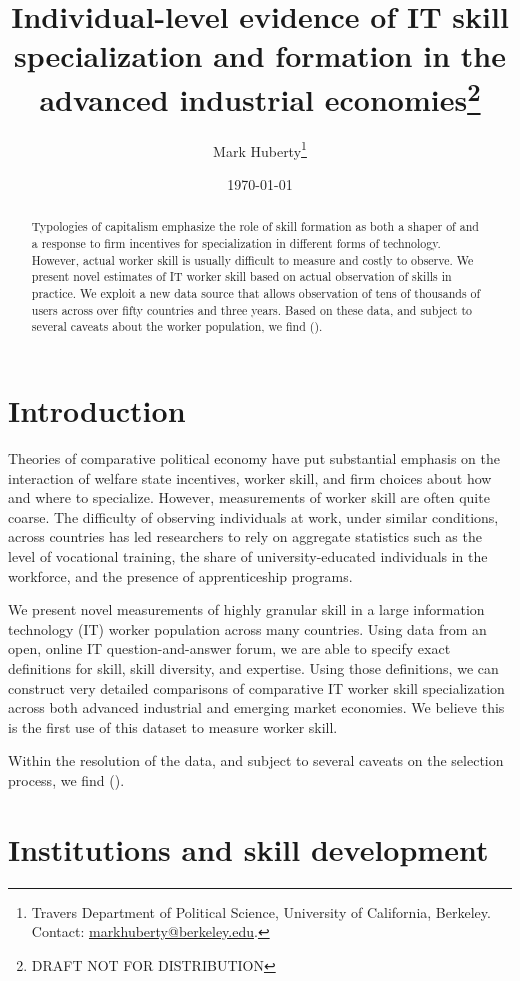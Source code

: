 \documentclass[11pt]{article}
\title{Individual-level evidence of IT skill specialization and formation
  in the advanced industrial economies\thanks{DRAFT NOT FOR DISTRIBUTION}}
\author{Mark Huberty\thanks{Travers Department of Political Science,
    University of California, Berkeley. Contact:
    \url{markhuberty@berkeley.edu}.}}
\date{\today}
\begin{document}
\maketitle
\doublespacing
\begin{abstract}
  Typologies of capitalism emphasize the role of skill formation as
  both a shaper of and a response to firm incentives for
  specialization in different forms of technology. However, actual
  worker skill is usually difficult to measure and costly to
  observe. We present novel estimates of IT worker skill based on
  actual observation of skills in practice. We exploit a new data
  source that allows observation of tens of thousands of users across
  over fifty countries and three years. Based on these data, and
  subject to several caveats about the worker population, we find (). 
\end{abstract}
\section{Introduction}
\label{sec:introduction}

Theories of comparative political economy have put substantial
emphasis on the interaction of welfare state incentives, worker skill,
and firm choices about how and where to specialize. However,
measurements of worker skill are often quite coarse. The difficulty of observing individuals at
work, under similar conditions, across countries has led researchers
to rely on aggregate
statistics such as the level of vocational training, the share of
university-educated individuals in the workforce, and the presence of
apprenticeship programs. 

We present novel measurements of highly granular skill in a large
information technology (IT) worker population across many countries. Using data from an open,
online IT question-and-answer forum, we are able to specify exact
definitions for skill, skill diversity, and expertise. Using those
definitions, we can construct very detailed comparisons of comparative
IT worker skill specialization across both advanced industrial and
emerging market economies. We believe this is the first use of this
dataset to measure worker skill.

Within the resolution of the data, and subject to several caveats on
the selection process, we find ().



\section{Institutions and skill development}
\label{sec:inst-skill-devel}
\end{document}
